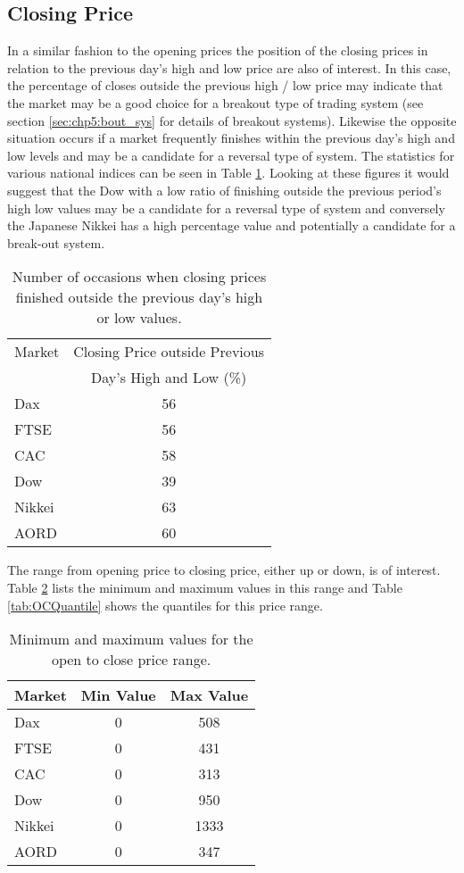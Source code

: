 \subsection{Closing Price}
\label{sec:closing_prices}
In a similar fashion to the opening prices the position of the closing prices in relation to the previous day's high and low price are also of interest. In this case, the percentage of closes outside the previous high / low price may indicate that the market may be a good choice for a breakout type of trading system (see section \ref{sec:chp5:bout_sys} for details of breakout systems). Likewise the opposite situation occurs if a market frequently finishes within the previous day's high and low levels and may be a candidate for a reversal type of system. The statistics for various national indices can be seen in Table \ref{tab:closeHL}. Looking at these figures it would suggest that the Dow with a low ratio of finishing outside the previous period's high low values may be a candidate for a reversal type of system and conversely the Japanese Nikkei has a high percentage value and potentially a candidate for a break-out system.

\begin{table}[!htbp] \centering 
  \caption[Closing Prices in relation to previous day's High and Low values]{Number of occasions when closing prices finished outside the previous day's high or low values.} 
  \label{tab:closeHL}
\begin{tabular}{lc} 
\toprule 
Market & Closing Price outside Previous   \\ 
       &  Day's High and Low (\%) \\
\midrule 
Dax & 56 \\ 
FTSE & 56  \\ 
CAC & 58 \\ 
Dow & 39  \\ 
Nikkei & 63 \\ 
AORD & 60 \\
\bottomrule 
\end{tabular} 
\end{table} 

The range from opening price to closing price, either up or down, is of interest. Table \ref{tab:OCrange} lists the minimum and maximum values in this range and Table \ref{tab:OCQuantile} shows the quantiles for this price range.

\begin{table}[!h] \centering 
  \caption[Daily Open to Close Price Range]{Minimum and maximum values for the open to close price range.} 
  \label{tab:OCrange}
\begin{tabular}{lcc} 
\toprule 
Market & Min Value & Max Value  \\ 
\midrule
Dax  & 0 & 508  \\ 
FTSE & 0 & 431  \\ 
CAC  & 0 & 313  \\ 
Dow  & 0 & 950  \\ 
Nikkei & 0 & 1333  \\ 
AORD   & 0 & 347  \\ 
\bottomrule
\end{tabular} 
\end{table} 


